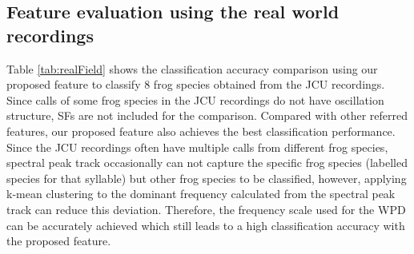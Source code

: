 \subsection{Feature evaluation using the real world recordings}
Table \ref{tab:realField} shows the classification accuracy comparison using our proposed feature to classify 8 frog species obtained from the JCU recordings. Since calls of some frog species in the JCU recordings do not have oscillation structure, SFs are not included for the comparison. Compared with other referred features, our proposed feature also achieves the best classification performance.
Since the JCU recordings often have multiple calls from different frog species, spectral peak track occasionally can not capture the specific frog species (labelled species for that syllable) but other frog species to be classified, however, applying k-mean clustering to the dominant frequency calculated from the spectral peak track can reduce this deviation. Therefore, the frequency scale used for the WPD can be accurately achieved which still leads to a high classification accuracy with the proposed feature.

\begin{table}[htb!]
\centering
\caption{Classification accuracy using the JCU recordings.}
\label{tab:realField}
\end{table}


